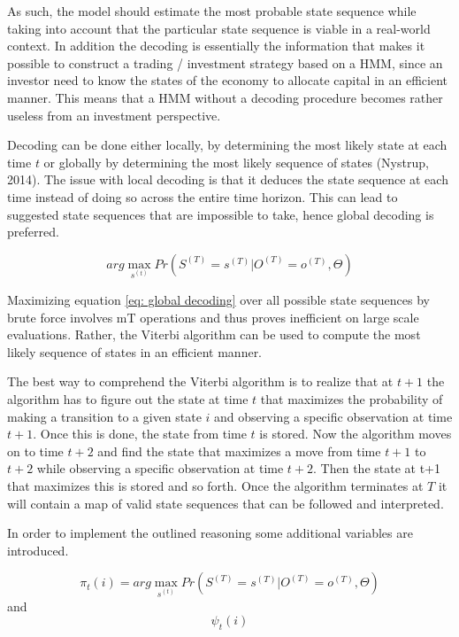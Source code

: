As such, the model should estimate the most probable state sequence while taking into account that the particular state sequence is viable in a real-world context. In addition the decoding is essentially the information that makes it possible to construct a trading / investment strategy based on a HMM, since an investor need to know the states of the economy to allocate capital in an efficient manner. This means that a HMM without a decoding procedure becomes rather useless from an investment perspective. 

Decoding can be done either locally, by determining the most likely state at each time $t$ or globally by determining the most likely sequence of states (Nystrup, 2014). The issue with local decoding is that it deduces the state sequence at each time instead of doing so across the entire time horizon. This can lead to suggested state sequences that are impossible to take, hence global decoding is preferred. 

\begin{equation}
    arg\max_{s^{(t)}}Pr(S^{(T)} = s^{(T)}|O^{(T)} = o^{(T)}, \Theta)
    \label{eq: global decoding}
\end{equation}

Maximizing equation \ref{eq: global decoding} over all possible state sequences by brute force involves mT operations and thus proves inefficient on large scale evaluations. Rather, the Viterbi algorithm can be used to compute
the most likely sequence of states in an efficient manner. 

The best way to comprehend the Viterbi algorithm is to realize that at $t+1$ the algorithm has to figure out the state at time $t$ that maximizes the probability of making a transition to a given state $i$ and observing a specific observation at time $t+1$. Once this is done, the state from time $t$ is stored. Now the algorithm moves on to time $t+2$ and find the state that maximizes a move from time $t+1$ to $t+2$ while observing a specific observation at time $t+2$. Then the state at t+1 that maximizes this is stored and so forth. Once the algorithm terminates at $T$ it will contain a map of valid state sequences that can be followed and interpreted. 

In order to implement the outlined reasoning some additional variables are introduced.

\begin{equation}
    \pi_t(i) =  arg\max_{s^{(t)}}Pr(S^{(T)} = s^{(T)}|O^{(T)} = o^{(T)}, \Theta)
\end{equation}
and 
$$
{\psi_t(i)}
$$


